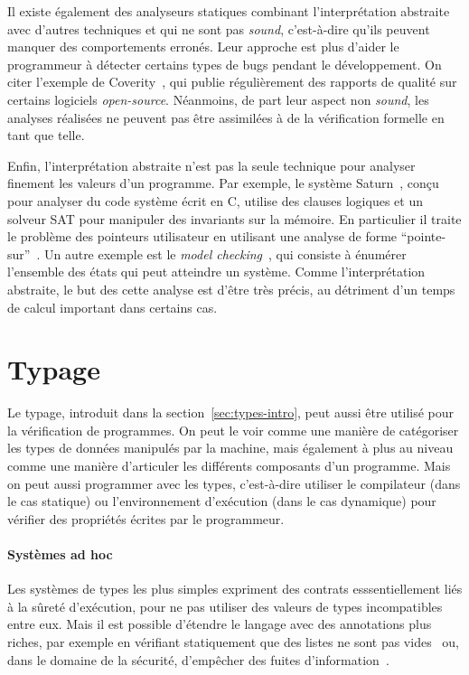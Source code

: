 Il existe également des analyseurs statiques combinant l'interprétation
abstraite avec d'autres techniques et qui ne sont pas \emph{sound}, c'est-à-dire
qu'ils peuvent manquer des comportements erronés. Leur approche est plus d'aider
le programmeur à détecter certains types de bugs pendant le développement. On
citer l'exemple de Coverity~\cite{coverityBillion}, qui publie régulièrement des
rapports de qualité sur certains logiciels \emph{open-source}. Néanmoins, de
part leur aspect non \emph{sound}, les analyses réalisées ne peuvent pas être
assimilées à de la vérification formelle en tant que telle.

Enfin, l'interprétation abstraite n'est pas la seule technique pour analyser
finement les valeurs d'un programme. Par exemple, le système
Saturn~\cite{paste07}, conçu pour analyser du code système écrit en C, utilise
des clauses logiques et un solveur SAT pour manipuler des invariants sur la
mémoire. En particulier il traite le problème des pointeurs utilisateur en
utilisant une analyse de forme \enquote{pointe-sur}~\cite{oakland08}. Un autre
exemple est le \emph{model checking}~\cite{modelcheck}, qui consiste à énumérer
l'ensemble des états qui peut atteindre un système. Comme l'interprétation
abstraite, le but des cette analyse est d'être très précis, au détriment d'un
temps de calcul important dans certains cas.

\section{Typage}

Le typage, introduit dans la section~\ref{sec:types-intro}, peut aussi être
utilisé pour la vérification de programmes. On peut le voir comme une manière de
catégoriser les types de données manipulés par la machine, mais également à plus
au niveau comme une manière d'articuler les différents composants d'un
programme. Mais on peut aussi programmer avec les types, c'est-à-dire utiliser
le compilateur (dans le cas statique) ou l'environnement d'exécution (dans le
cas dynamique) pour vérifier des propriétés écrites par le programmeur.

\paragraph{Systèmes ad hoc}

Les systèmes de types les plus simples expriment des contrats esssentiellement
liés à la sûreté d'exécution, pour ne pas utiliser des valeurs de types
incompatibles entre eux. Mais il est possible d'étendre le langage avec des
annotations plus riches, par exemple en vérifiant statiquement que des listes ne
sont pas vides~\cite{lightweight-static-capabilities} ou, dans le domaine de la
sécurité, d'empêcher des fuites d'information~\cite{LZ06a}.

